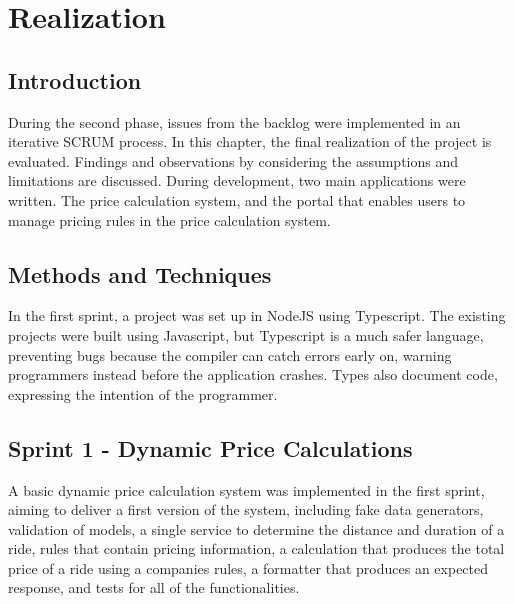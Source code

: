 \graphicspath{{Chapter5/Figs/Vector/}{Chapter5/Figs/}}

%
\chapter{Realization}
\section{Introduction}
During the second phase, issues from the backlog were implemented in an iterative SCRUM process. In this chapter, the final realization of the project is evaluated. Findings and observations by considering the assumptions and limitations are discussed. During development, two main applications were written. The price calculation system, and the portal that enables users to manage pricing rules in the price calculation system.

%
\section{Methods and Techniques}
In the first sprint, a project was set up in NodeJS using Typescript. The existing projects were built using Javascript, but Typescript is a much safer language, preventing bugs because the compiler can catch errors early on, warning programmers instead before the application crashes. Types also document code, expressing the intention of the programmer.

%
\section{Sprint 1 - Dynamic Price Calculations}
A basic dynamic price calculation system was implemented in the first sprint, aiming to deliver a first version of the system, including fake data generators, validation of models, a single service to determine the distance and duration of a ride, rules that contain pricing information, a calculation that produces the total price of a ride using a companies rules, a formatter that produces an expected response, and tests for all of the functionalities.

